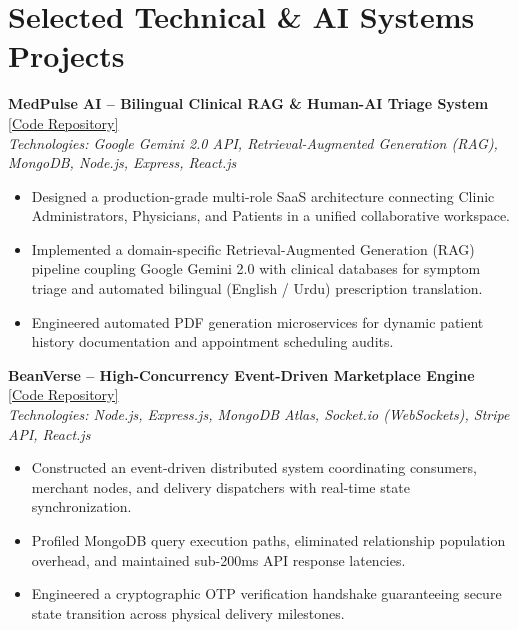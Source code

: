 \documentclass[10pt,a4paper]{article}
\begin{document}
\section{Selected Technical \& AI Systems Projects}

\textbf{MedPulse AI -- Bilingual Clinical RAG \& Human-AI Triage System} \hfill \href{https://github.com/nabilroghani/AI-Powered-Clinic-Management-SaaS}{[Code Repository]} \\
\textit{Technologies: Google Gemini 2.0 API, Retrieval-Augmented Generation (RAG), MongoDB, Node.js, Express, React.js}
\begin{itemize}
    \item Designed a production-grade multi-role SaaS architecture connecting Clinic Administrators, Physicians, and Patients in a unified collaborative workspace.
    \item Implemented a domain-specific Retrieval-Augmented Generation (RAG) pipeline coupling Google Gemini 2.0 with clinical databases for symptom triage and automated bilingual (English / Urdu) prescription translation.
    \item Engineered automated PDF generation microservices for dynamic patient history documentation and appointment scheduling audits.
\end{itemize}

\vspace{3pt}
\textbf{BeanVerse -- High-Concurrency Event-Driven Marketplace Engine} \hfill \href{https://github.com/nabilroghani/bean-verse}{[Code Repository]} \\
\textit{Technologies: Node.js, Express.js, MongoDB Atlas, Socket.io (WebSockets), Stripe API, React.js}
\begin{itemize}
    \item Constructed an event-driven distributed system coordinating consumers, merchant nodes, and delivery dispatchers with real-time state synchronization.
    \item Profiled MongoDB query execution paths, eliminated relationship population overhead, and maintained sub-200ms API response latencies.
    \item Engineered a cryptographic OTP verification handshake guaranteeing secure state transition across physical delivery milestones.
\end{itemize}
\end{document}
